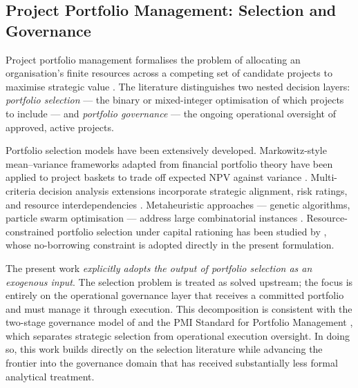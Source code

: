 \subsection{Project Portfolio Management: Selection and Governance}
\label{subsec:lr_ppm}

Project portfolio management formalises the problem of allocating an
organisation's finite resources across a competing set of candidate projects to
maximise strategic value \citep{Archer1999, Cooper2001}. The literature
distinguishes two nested decision layers: \emph{portfolio selection} --- the
binary or mixed-integer optimisation of which projects to include --- and
\emph{portfolio governance} --- the ongoing operational oversight of approved,
active projects.

Portfolio selection models have been extensively developed. Markowitz-style
mean--variance frameworks adapted from financial portfolio theory
\citep{Markowitz1952} have been applied to project baskets to trade off
expected NPV against variance \citep{Eilat2006}. Multi-criteria decision
analysis extensions incorporate strategic alignment, risk ratings, and resource
interdependencies \citep{Martinsuo2007, Killen2008}. Metaheuristic approaches
--- genetic algorithms, particle swarm optimisation --- address large
combinatorial instances \citep{Zhang2020}. Resource-constrained portfolio
selection under capital rationing has been studied by \citet{kavadias2003resource},
whose no-borrowing constraint is adopted directly in the present formulation.

The present work \emph{explicitly adopts the output of portfolio selection as
an exogenous input}. The selection problem is treated as solved upstream; the
focus is entirely on the operational governance layer that receives a committed
portfolio and must manage it through execution. This decomposition is consistent
with the two-stage governance model of \citet{Turner2014} and the PMI Standard
for Portfolio Management \citep{PMI2017}, which separates strategic selection
from operational execution oversight. In doing so, this work builds directly on
the selection literature while advancing the frontier into the governance domain
that has received substantially less formal analytical treatment.


